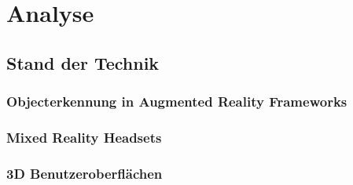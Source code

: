 \chapter{Analyse}

\section{Stand der Technik}


\subsection{Objecterkennung in Augmented Reality Frameworks}




\subsection{Mixed Reality Headsets}



\subsection{3D Benutzeroberflächen}


